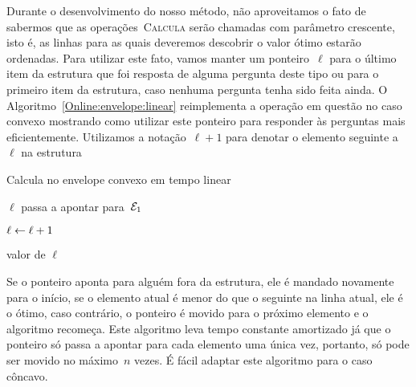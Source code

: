 Durante o desenvolvimento do nosso método, não aproveitamos o fato de sabermos que as operações~\textsc{Calcula} serão chamadas com parâmetro crescente, isto é, as linhas para as quais deveremos descobrir o valor ótimo estarão ordenadas. Para utilizar este fato, vamos manter um ponteiro~$\ell$ para o último item da estrutura que foi resposta de alguma pergunta deste tipo ou para o primeiro item da estrutura, caso nenhuma pergunta tenha sido feita ainda. O Algoritmo~\ref{Online:envelope:linear} reimplementa a operação em questão no caso convexo mostrando como utilizar este ponteiro para responder às perguntas mais eficientemente. Utilizamos a notação~$\ell + 1$ para denotar o elemento seguinte a~$\ell$ na estrutura

\begin{algorithm}[h]
\caption{Calcula no envelope convexo em tempo linear}
\label{Online:envelope:linear}
\begin{algorithmic}[1]
        \State $\ell$ passa a apontar para~$\mathcal{E}_1$
    \EndIf
    
        \State $\ell \leftarrow \ell+1$
    \EndWhile

    \State \Return valor de $\ell$
\EndFunction
\end{algorithmic}
\end{algorithm}

Se o ponteiro aponta para alguém fora da estrutura, ele é mandado novamente para o início, se o elemento atual é menor do que o seguinte na linha atual, ele é o ótimo, caso contrário, o ponteiro é movido para o próximo elemento e o algoritmo recomeça. Este algoritmo leva tempo constante amortizado já que o ponteiro só passa a apontar para cada elemento uma única vez, portanto, só pode ser movido no máximo~$n$ vezes. É fácil adaptar este algoritmo para o caso côncavo.
